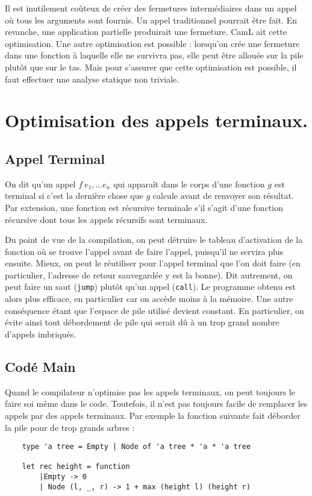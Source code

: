 \documentclass{cours}
\begin{document}
Il est inutilement coûteux de créer des fermetures intermédiaires dans un appel où tous les arguments sont fournis. Un appel traditionnel pourrait être fait. En revanche, une application partielle produirait une fermeture. CamL ait cette optimisation.
Une autre optimisation est possible : lorsqu'on crée une fermeture dans une fonction à laquelle elle ne survivra pas, elle peut être allouée sur la pile plutôt que sur le tas. Mais pour s'assurer que cette optimisation est possible, il faut effectuer une analyse statique non triviale.

\section{Optimisation des appels terminaux.}
\subsection{Appel Terminal}
\begin{definition}
    On dit qu'un appel $f\ e_{1}, \ldots e_{n}$ qui apparaît dans le corps d'une fonction $g$ est terminal si c'est la dernière chose que $g$ calcule avant de renvoyer son résultat. Par extension, une fonction est récursive terminale s'il s'agit d'une fonction récursive dont tous les appels récursifs sont terminaux.
\end{definition}

Du point de vue de la compilation, on peut détruire le tableau d'activation de la fonction où se trouve l'appel avant de faire l'appel, puisqu'il ne servira plus ensuite. Mieux, on peut le réutiliser pour l'appel terminal que l'on doit faire (en particulier, l'adresse de retour sauvegardée y est la bonne). Dit autrement, on peut faire un saut (\texttt{jump}) plutôt qu'un appel (\texttt{call}).
Le programme obtenu est alors plus efficace, en particulier car on accède moins à la mémoire. Une autre conséquence étant que l'espace de pile utilisé devient constant. En particulier, on évite ainsi tout débordement de pile qui serait dû à un trop grand nombre d'appels imbriqués.

\subsection{Codé Main}
Quand le compilateur n'optimise pas les appels terminaux, on peut toujours le faire soi même dans le code. Toutefois, il n'est pas toujours facile de remplacer les appels par des appels terminaux.
Par exemple la fonction suivante fait déborder la pile pour de trop grands arbres :
\begin{verbatim}
    type 'a tree = Empty | Node of 'a tree * 'a * 'a tree

    let rec height = function 
        |Empty -> 0
        | Node (l, _, r) -> 1 + max (height l) (height r)
\end{verbatim}
\end{document}
